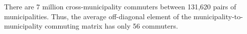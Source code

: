 There are 7 million cross-municipality commuters between 131,620 pairs of municipalities.
Thus, the average off-diagonal element of the municipality-to-municipality commuting matrix has only 56 commuters.
